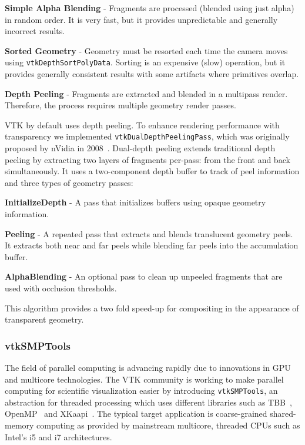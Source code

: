 \begin{compactitem}
\item \textbf{Simple Alpha Blending} - Fragments are processed (blended using just alpha) in random order.
  It is very fast, but it provides unpredictable and generally incorrect results.
\item \textbf{Sorted Geometry} - Geometry must be resorted each time the camera moves using \texttt{vtkDepthSortPolyData}.
  Sorting is an expensive (slow) operation, but it provides generally consistent results with some artifacts where primitives overlap.
\item \textbf{Depth Peeling} - Fragments are extracted and blended in a multipass render. Therefore, the process requires multiple geometry render passes.
\end{compactitem}

VTK by default uses depth peeling.
To enhance rendering performance with transparency we implemented \texttt{vtkDualDepthPeelingPass}, which was originally proposed by nVidia in 2008~\cite{Bavoil:2008}.
Dual-depth peeling extends traditional depth peeling by extracting two layers of fragments per-pass: from the front and back simultaneously.
It uses a two-component depth buffer to track of peel information and three types of geometry passes:

\begin{compactitem}
\item \textbf{InitializeDepth} - A pass that initializes buffers using opaque geometry information.
\item \textbf{Peeling} - A repeated pass that extracts and blends translucent geometry peels. It extracts both near and far peels while blending far peels into the accumulation buffer.
\item \textbf{AlphaBlending} - An optional pass to clean up unpeeled fragments that are used with occlusion thresholds.
\end{compactitem}

This algorithm provides a two fold speed-up for compositing in the appearance of transparent geometry.

\subsubsection{vtkSMPTools}

The field of parallel computing is advancing rapidly due to innovations in GPU and multicore technologies.
The VTK community is working to make parallel computing for scientific visualization easier by introducing \texttt{vtkSMPTools}, an abstraction for threaded processing which uses different libraries such as TBB~\cite{TBB:2016}, OpenMP~\cite{OpenMP:2016} and XKaapi~\cite{Gautier:2013}.
The typical target application is coarse-grained shared-memory computing as provided by mainstream multicore, threaded CPUs such as Intel's i5 and i7 architectures.

